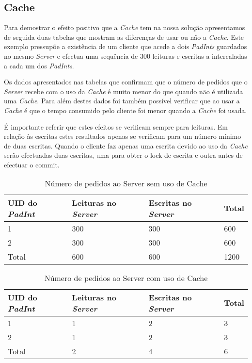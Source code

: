\subsection{Cache}
Para demostrar o efeito positivo que a \textit{Cache} tem na nossa solução apresentamos de seguida duas tabelas que mostram as diferenças de usar ou não a \textit{Cache}. Este exemplo pressupõe a existência de um cliente que acede a dois \textit{PadInts} guardados no mesmo \textit{Server} e efectua uma sequência de 300 leituras e escritas a intercaladas a cada um dos \textit{PadInts}.

Os dados apresentados nas tabelas que confirmam que o número de pedidos que o \textit{Server} recebe com o uso da \textit{Cache} é muito menor do que quando não é utilizada uma \textit{Cache}. Para além destes dados foi também possível verificar que ao usar a \textit{Cache} é que o tempo consumido pelo cliente foi menor quando a \textit{Cache} foi usada.

É importante referir que estes efeitos se verificam sempre para leituras. Em relação às escritas estes resultados apenas se verificam para um número mínimo de duas escritas. Quando o cliente faz apenas uma escrita devido ao uso da \textit{Cache} serão efectuadas duas escritas, uma para obter o lock de escrita e outra antes de efectuar o commit.

\begin{table}[H]
\centering
\begin{tabular}{| p{1.5cm} | p{1.5cm} | p{1.5cm} | p{1.5cm} |}
\hline
\textbf{UID do \textit{PadInt}} & \textbf{Leituras no \textit{Server}} & \textbf{Escritas no \textit{Server}} & \textbf{Total} \\
\hline
1 & 300 & 300 & 600  \\
\hline
2 & 300 & 300 & 600  \\
\hline
Total & 600 & 600 & 1200  \\
\hline
\end{tabular}
\caption{Número de pedidos ao Server sem uso de Cache} \label{figAcache}
\end{table}

\begin{table}[H]
\centering
\begin{tabular}{| p{1.5cm} | p{1.5cm} | p{1.5cm} | p{1.5cm} |}
\hline
\textbf{UID do \textit{PadInt}} & \textbf{Leituras no \textit{Server}} & \textbf{Escritas no \textit{Server}} & \textbf{Total} \\
\hline
1 & 1 & 2 & 3  \\
\hline
2 & 1 & 2 & 3  \\
\hline
Total & 2 & 4 & 6  \\
\hline
\end{tabular}
\caption{Número de pedidos ao Server com uso de Cache} \label{figBcache}
\end{table}